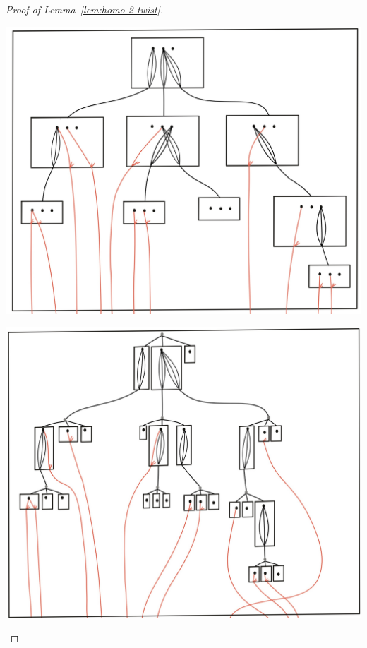 \begin{proof}[Proof of Lemma~\ref{lem:homo-2-twist}]
\begin{center}
\includegraphics[scale=.07]{MyPic35.jpg}
\end{center} 
\begin{center}
\includegraphics[scale=.07]{MyPic36.jpg}
\end{center} 
\begin{center}

\end{center}
\end{proof}
